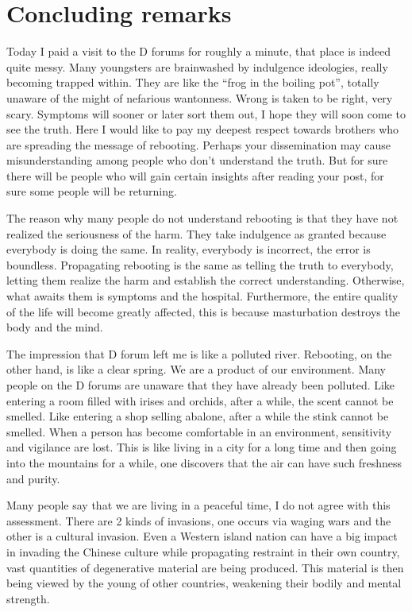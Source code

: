 \documentclass[
]{book}
\begin{document}
\hypertarget{concluding-remarks-1}{%
\section{Concluding remarks}\label{concluding-remarks-1}}

Today I paid a visit to the D forums for roughly a minute, that place is indeed quite messy. Many youngsters are brainwashed by indulgence ideologies, really becoming trapped within. They are like the ``frog in the boiling pot'', totally unaware of the might of nefarious wantonness. Wrong is taken to be right, very scary. Symptoms will sooner or later sort them out, I hope they will soon come to see the truth. Here I would like to pay my deepest respect towards brothers who are spreading the message of rebooting. Perhaps your dissemination may cause misunderstanding among people who don't understand the truth. But for sure there will be people who will gain certain insights after reading your post, for sure some people will be returning.

The reason why many people do not understand rebooting is that they have not realized the seriousness of the harm. They take indulgence as granted because everybody is doing the same. In reality, everybody is incorrect, the error is boundless. Propagating rebooting is the same as telling the truth to everybody, letting them realize the harm and establish the correct understanding. Otherwise, what awaits them is symptoms and the hospital. Furthermore, the entire quality of the life will become greatly affected, this is because masturbation destroys the body and the mind.

The impression that D forum left me is like a polluted river. Rebooting, on the other hand, is like a clear spring. We are a product of our environment. Many people on the D forums are unaware that they have already been polluted. Like entering a room filled with irises and orchids, after a while, the scent cannot be smelled. Like entering a shop selling abalone, after a while the stink cannot be smelled. When a person has become comfortable in an environment, sensitivity and vigilance are lost. This is like living in a city for a long time and then going into the mountains for a while, one discovers that the air can have such freshness and purity.

Many people say that we are living in a peaceful time, I do not agree with this assessment. There are 2 kinds of invasions, one occurs via waging wars and the other is a cultural invasion. Even a Western island nation can have a big impact in invading the Chinese culture while propagating restraint in their own country, vast quantities of degenerative material are being produced. This material is then being viewed by the young of other countries, weakening their bodily and mental strength.
\end{document}
